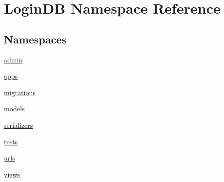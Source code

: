 \hypertarget{namespace_login_d_b}{}\section{Login\+DB Namespace Reference}
\label{namespace_login_d_b}
\subsection*{Namespaces}
\begin{DoxyCompactItemize}
\item 
 \hyperlink{namespace_login_d_b_1_1admin}{admin}
\item 
 \hyperlink{namespace_login_d_b_1_1apps}{apps}
\item 
 \hyperlink{namespace_login_d_b_1_1migrations}{migrations}
\item 
 \hyperlink{namespace_login_d_b_1_1models}{models}
\item 
 \hyperlink{namespace_login_d_b_1_1serializers}{serializers}
\item 
 \hyperlink{namespace_login_d_b_1_1tests}{tests}
\item 
 \hyperlink{namespace_login_d_b_1_1urls}{urls}
\item 
 \hyperlink{namespace_login_d_b_1_1views}{views}
\end{DoxyCompactItemize}
